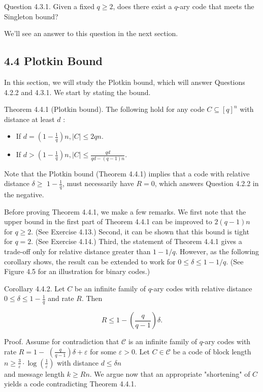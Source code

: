 \documentclass[10pt]{article}
\begin{document}
Question 4.3.1. Given a fixed $q \geq 2$, does there exist a $q$-ary code that meets the Singleton bound?

We'll see an answer to this question in the next section.

\subsection*{4.4 Plotkin Bound}
In this section, we will study the Plotkin bound, which will answer Questions 4.2.2 and 4.3.1. We start by stating the bound.

Theorem 4.4.1 (Plotkin bound). The following hold for any code $C \subseteq[q]^{n}$ with distance at least $d$ :

\begin{itemize}
  \item[1.] If $d=\left(1-\frac{1}{q}\right) n,|C| \leq 2 q n$.
  \item[2.] If $d>\left(1-\frac{1}{q}\right) n,|C| \leq \frac{q d}{q d-(q-1) n}$.
\end{itemize}

Note that the Plotkin bound (Theorem 4.4.1) implies that a code with relative distance $\delta \geq$ $1-\frac{1}{q}$, must necessarily have $R=0$, which answers Question 4.2.2 in the negative.

Before proving Theorem 4.4.1, we make a few remarks. We first note that the upper bound in the first part of Theorem 4.4.1 can be improved to $2(q-1) n$ for $q \geq 2$. (See Exercise 4.13.) Second, it can be shown that this bound is tight for $q=2$. (See Exercise 4.14.) Third, the statement of Theorem 4.4.1 gives a trade-off only for relative distance greater than $1-1 / q$. However, as the following corollary shows, the result can be extended to work for $0 \leq \delta \leq 1-1 / q$. (See Figure 4.5 for an illustration for binary codes.)

Corollary 4.4.2. Let $C$ be an infinite family of $q$-ary codes with relative distance $0 \leq \delta \leq 1-\frac{1}{q}$ and rate $R$. Then

$$
R \leq 1-\left(\frac{q}{q-1}\right) \delta .
$$

Proof. Assume for contradiction that $\mathscr{C}$ is an infinite family of $q$-ary codes with rate $R=1-$ $\left(\frac{q}{q-1}\right) \delta+\varepsilon$ for some $\varepsilon>0$. Let $C \in \mathscr{C}$ be a code of block length $n \geq \frac{3}{\varepsilon} \cdot \log \left(\frac{1}{\varepsilon}\right)$ with distance $d \leq \delta n$\\
and message length $k \geq R n$. We argue now that an appropriate "shortening" of $C$ yields a code contradicting Theorem 4.4.1.
\end{document}
